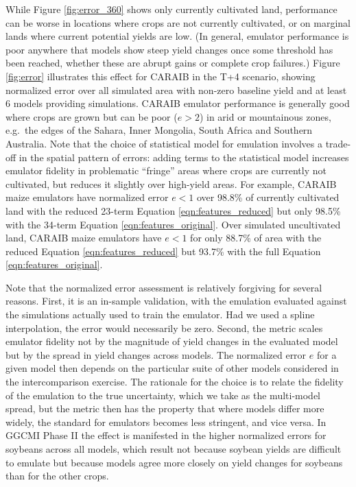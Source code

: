 \documentclass[gmd, manuscript]{copernicus} %
\begin{document}
While Figure \ref{fig:error_360} shows only currently cultivated land, performance can be worse in locations where crops are not currently cultivated, or on marginal lands where current potential yields are low. (In general, emulator performance is poor anywhere that models show steep yield changes once some threshold has been reached, whether these are abrupt gains or complete crop failures.) 
Figure \ref{fig:error} illustrates this effect for CARAIB in the T+4 scenario, showing normalized error over all simulated area with non-zero baseline yield and at least 6 models providing simulations. CARAIB emulator performance is generally good where crops are grown but can be poor ($e > 2$) in arid or mountainous zones, e.g.\ the edges of the Sahara, Inner Mongolia, South Africa and Southern Australia. %
Note that the choice of statistical model for emulation involves a trade-off in the spatial pattern of errors: adding terms to the statistical model increases emulator fidelity in problematic ``fringe'' areas where crops are currently not cultivated, but reduces it slightly over high-yield areas.
For example, CARAIB maize emulators have normalized error $e < 1$ over 98.8\% of currently cultivated land with the reduced 23-term Equation \ref{eqn:features_reduced} but only 98.5\% with the 34-term Equation \ref{eqn:features_original}. 
Over simulated uncultivated land, CARAIB maize emulators have $e < 1$ for only 88.7\% of area with the reduced Equation \ref{eqn:features_reduced} but 93.7\% with the full Equation \ref{eqn:features_original}. 

Note that the normalized error assessment is relatively forgiving for several reasons. 
First, it is an in-sample validation, with the emulation evaluated against the simulations actually used to train the emulator. 
Had we used a spline interpolation, the error would necessarily be zero. 
Second, the metric scales emulator fidelity not by the magnitude of yield changes in the evaluated model but by the spread in yield changes across models. 
The normalized error $e$ for a given model then depends on the particular suite of other models considered in the intercomparison exercise.  
The rationale for the choice is to relate the fidelity of the emulation to the true uncertainty, which we take as the multi-model spread, but  
the metric then has the property that where models differ more widely, the standard for emulators becomes less stringent, and vice versa.
In GGCMI Phase II the effect is manifested in the higher normalized errors for soybeans across all models, which result not because soybean yields are difficult to emulate but because models agree more closely on yield changes for soybeans than for the other crops.
\end{document}
